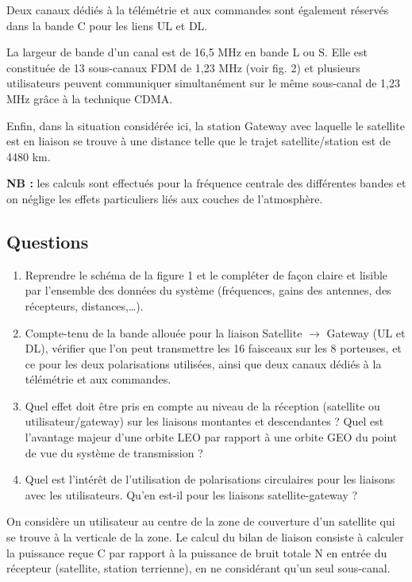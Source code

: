 \documentclass[a4paper,11pt]{article}
\begin{document}
Deux canaux dédiés à la télémétrie et aux commandes sont également réservés dans la bande C pour les liens UL et DL.

La largeur de bande d'un canal est de 16,5 MHz en bande L ou S. Elle est constituée de 13 sous-canaux FDM de 1,23 MHz (voir fig. 2) et plusieurs utilisateurs peuvent communiquer simultanément sur le même sous-canal de 1,23 MHz grâce à la technique CDMA.

Enfin, dans la situation considérée ici, la station Gateway avec laquelle le satellite est en liaison se trouve à une distance telle que le trajet satellite/station est de 4480 km.

\textbf{NB :} les calculs sont effectués pour la fréquence centrale des différentes bandes et on néglige les effets particuliers liés aux couches de l'atmosphère.

\subsection*{Questions}

\begin{enumerate}
    \item Reprendre le schéma de la figure 1 et le compléter de façon claire et lisible par l'ensemble des données du système (fréquences, gains des antennes, des récepteurs, distances,\ldots).
    
    \item Compte-tenu de la bande allouée pour la liaison Satellite $\rightarrow$ Gateway (UL et DL), vérifier que l'on peut transmettre les 16 faisceaux sur les 8 porteuses, et ce pour les deux polarisations utilisées, ainsi que deux canaux dédiés à la télémétrie et aux commandes.
    
    \item Quel effet doit être pris en compte au niveau de la réception (satellite ou utilisateur/gateway) sur les liaisons montantes et descendantes ? Quel est l'avantage majeur d'une orbite LEO par rapport à une orbite GEO du point de vue du système de transmission ?
    
    \item Quel est l'intérêt de l'utilisation de polarisations circulaires pour les liaisons avec les utilisateurs. Qu'en est-il pour les liaisons satellite-gateway ?
\end{enumerate}

On considère un utilisateur au centre de la zone de couverture d'un satellite qui se trouve à la verticale de la zone. Le calcul du bilan de liaison consiste à calculer la puissance reçue C par rapport à la puissance de bruit totale N en entrée du récepteur (satellite, station terrienne), en ne considérant qu'un seul sous-canal.
\end{document}
